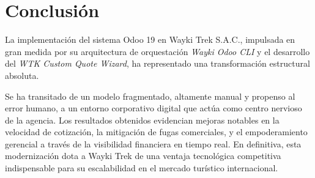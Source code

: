\section{Conclusión}

La implementación del sistema Odoo 19 en Wayki Trek S.A.C., impulsada en gran medida por su arquitectura de orquestación \textit{Wayki Odoo CLI} y el desarrollo del \textit{WTK Custom Quote Wizard}, ha representado una transformación estructural absoluta. 

Se ha transitado de un modelo fragmentado, altamente manual y propenso al error humano, a un entorno corporativo digital que actúa como centro nervioso de la agencia. Los resultados obtenidos evidencian mejoras notables en la velocidad de cotización, la mitigación de fugas comerciales, y el empoderamiento gerencial a través de la visibilidad financiera en tiempo real. En definitiva, esta modernización dota a Wayki Trek de una ventaja tecnológica competitiva indispensable para su escalabilidad en el mercado turístico internacional.
